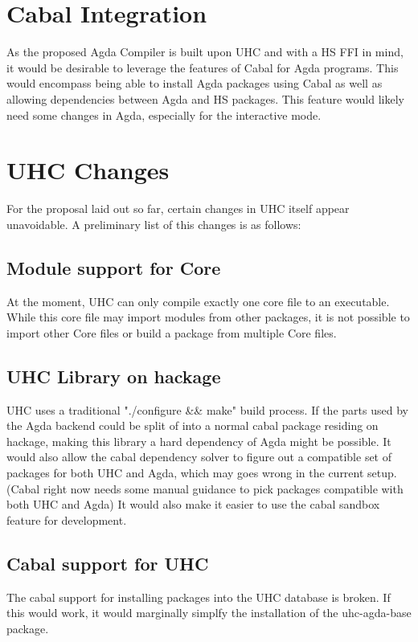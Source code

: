 \documentclass[12pt, a4paper, twoside]{report}
\begin{document}
\section{Cabal Integration}
As the proposed Agda Compiler is built upon UHC and with a HS FFI in mind, it would be desirable
to leverage the features of Cabal for Agda programs. This would encompass being able
to install Agda packages using Cabal as well as allowing dependencies between Agda and HS packages.
This feature would likely need some changes in Agda, especially
for the interactive mode.

\section{UHC Changes}
For the proposal laid out so far, certain changes in UHC itself appear
unavoidable. A preliminary list of this changes is as follows:


\subsection{Module support for Core}
At the moment, UHC can only compile exactly one core file to an executable.
While this core file may import modules from other packages, it is not possible
to import other Core files or build a package from multiple Core files.

\subsection{UHC Library on hackage}
UHC uses a traditional "./configure \&\& make" build process. If the parts used by the
Agda backend could be split of into a normal cabal package residing on hackage,
making this library a hard dependency of Agda might be possible.
It would also allow the cabal dependency solver to figure out a compatible
set of packages for both UHC and Agda, which may goes wrong in the current setup.
(Cabal right now needs some manual guidance to pick packages compatible with both UHC and Agda)
It would also make it easier to use the cabal sandbox feature for development.

\subsection{Cabal support for UHC}
The cabal support for installing packages into the UHC database is broken. If this would work, it
would marginally simplfy the installation of the uhc-agda-base package.


{}

\end{document}
